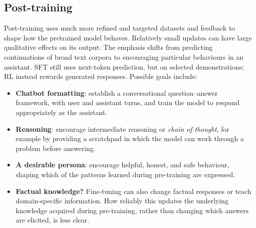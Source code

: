 \subsection{Post-training}

Post-training uses much more refined and targeted datasets and feedback to shape how the pretrained model behaves. Relatively small updates can have large qualitative effects on its output. The emphasis shifts from predicting continuations of broad text corpora to encouraging particular behaviours in an assistant. SFT still uses next-token prediction, but on selected demonstrations; RL instead rewards generated responses. Possible goals include:
\begin{itemize}
  \item \textbf{Chatbot formatting}: establish a conversational question--answer framework, with user and assistant turns, and train the model to respond appropriately as the assistant.
  \item \textbf{Reasoning}: encourage intermediate reasoning or \emph{chain of thought}, for example by providing a scratchpad in which the model can work through a problem before answering.
  \item \textbf{A desirable persona}: encourage helpful, honest, and safe behaviour, shaping which of the patterns learned during pre-training are expressed.
  \item \textbf{Factual knowledge?} Fine-tuning can also change factual responses or teach domain-specific information. How reliably this updates the underlying knowledge acquired during pre-training, rather than changing which answers are elicited, is less clear.
\end{itemize}


